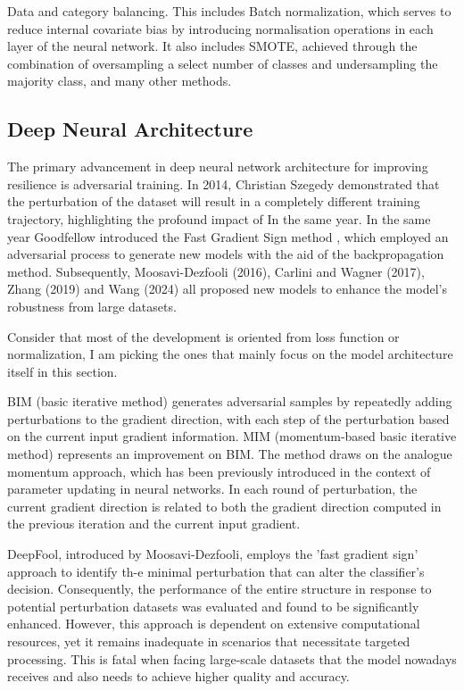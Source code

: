 \documentclass{article}
\begin{document}
Data and category balancing. This includes Batch normalization\cite{ioffe2015batchnormalizationacceleratingdeep}, which serves to reduce internal covariate bias by introducing normalisation operations in each layer of the neural network. It also includes SMOTE\cite{Chawla_2002}, achieved through the combination of oversampling a select number of classes and undersampling the majority class, and many other methods.


\subsection{Deep Neural Architecture}

The primary advancement in deep neural network architecture for improving resilience is adversarial training. In 2014, Christian Szegedy demonstrated that the perturbation of the dataset will result in a completely different training trajectory\cite{szegedy2014intriguingpropertiesneuralnetworks}, highlighting the profound impact of In the same year. In the same year Goodfellow introduced the Fast Gradient Sign method\cite{Goodfellow2014GenerativeAN} , which employed an adversarial process to generate new models with the aid of the backpropagation method. Subsequently, Moosavi-Dezfooli (2016), Carlini and Wagner (2017), Zhang (2019) and Wang (2024) all proposed new models to enhance the model's robustness from large datasets.

Consider that most of the development is oriented from loss function or normalization, I am picking the ones that mainly focus on the model architecture itself in this section.

BIM (basic iterative method) \cite{kurakin2017adversarialmachinelearningscale} generates adversarial samples by repeatedly adding perturbations to the gradient direction, with each step of the perturbation based on the current input gradient information. MIM (momentum-based basic iterative method) \cite{dong2018boostingadversarialattacksmomentum} represents an improvement on BIM. The method draws on the analogue momentum approach, which has been previously introduced in the context of parameter updating in neural networks. In each round of perturbation, the current gradient direction is related to both the gradient direction computed in the previous iteration and the current input gradient.

DeepFool\cite{moosavidezfooli2016deepfoolsimpleaccuratemethod}, introduced by Moosavi-Dezfooli, employs the 'fast gradient sign' approach to identify th-e minimal perturbation that can alter the classifier's decision. Consequently, the performance of the entire structure in response to potential perturbation datasets was evaluated and found to be significantly enhanced. However, this approach is dependent on extensive computational resources, yet it remains inadequate in scenarios that necessitate targeted processing. This is fatal when facing large-scale datasets that the model nowadays receives and also needs to achieve higher quality and accuracy.
\end{document}
